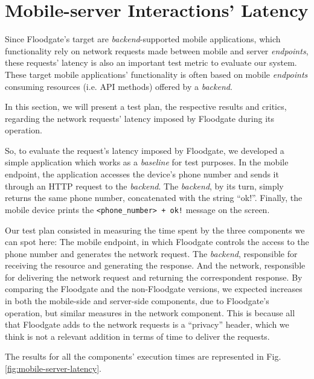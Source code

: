 \section{Mobile-server Interactions' Latency}
\label{sec:mobile-server-latency-eval}

Since Floodgate's target are \textit{backend}-supported mobile applications, which functionality rely on network requests made between mobile and server \textit{endpoints}, these requests' latency is also an important test metric to evaluate our system. These target mobile applications' functionality is often based on mobile \textit{endpoints} consuming resources (i.e. API methods) offered by a \textit{backend}. 

In this section, we will present a test plan, the respective results and critics, regarding the network requests' latency imposed by Floodgate during its operation.

So, to evaluate the request's latency imposed by Floodgate, we developed a simple application which works as a \textit{baseline} for test purposes. In the mobile endpoint, the application accesses the device's phone number and sends it through an HTTP request to the \textit{backend}. The \textit{backend}, by its turn, simply returns the same phone number, concatenated with the string ``ok!''. Finally, the mobile device prints the \texttt{<phone\_number> + ok!} message on the screen. 

Our test plan consisted in measuring the time spent by the three components we can spot here: The mobile endpoint, in which Floodgate controls the access to the phone number and generates the network request. The \textit{backend}, responsible for receiving the resource and generating the response. And the network, responsible for delivering the network request and returning the correspondent response. By comparing the Floodgate and the non-Floodgate versions, we expected increases in both the mobile-side and server-side components, due to Floodgate's operation, but similar measures in the network component. This is because all that Floodgate adds to the network requests is a ``privacy'' header, which we think is not a relevant addition in terms of time to deliver the requests.

The results for all the components' execution times are represented in Fig. \ref{fig:mobile-server-latency}.

